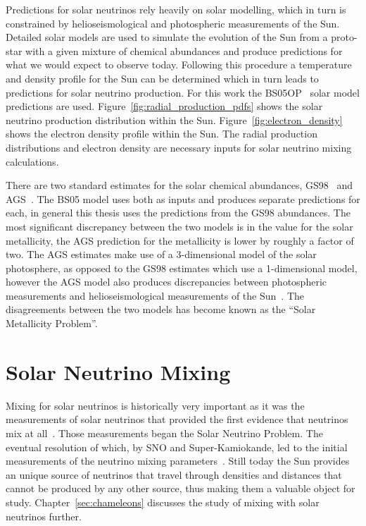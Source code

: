 Predictions for solar neutrinos rely heavily on solar modelling, which in turn
is constrained by helioseismological and photospheric measurements of the Sun.
Detailed solar models are used to simulate the evolution of the Sun from a proto-star
with a given mixture of chemical abundances and produce predictions for
what we would expect to observe today.
Following this procedure a temperature and density profile for the Sun can be determined
which in turn leads to predictions for solar neutrino production.
For this work the BS05OP~\citep{bs_ssm} solar model predictions are used.
Figure~\ref{fig:radial_production_pdfs} shows the solar neutrino production
distribution within the Sun.
Figure~\ref{fig:electron_density} shows the electron density profile within
the Sun.
The radial production distributions and electron density are necessary inputs
for solar neutrino mixing calculations.

There are two standard estimates for the solar chemical abundances,
GS98~\citep{gs98} and AGS~\citep{ags}.
The BS05 model uses both as inputs and produces separate predictions for each,
in general this thesis uses the predictions from the GS98 abundances.
The most significant discrepancy between the two models is in the value
for the solar metallicity, the AGS prediction for the metallicity is
lower by roughly a factor of two.
The AGS estimates make use of a 3-dimensional model of the solar photosphere,
as opposed to the GS98 estimates which use a 1-dimensional model, however
the AGS model also produces discrepancies between photospheric measurements
and helioseismological measurements of the Sun~\citep{ags, bahcall_ssm}.
The disagreements between the two models has become known as the
``Solar Metallicity Problem''.


\section{Solar Neutrino Mixing}
\label{sec:solar_nu_mixing}
Mixing for solar neutrinos is historically very important as it was
the measurements of solar neutrinos that provided the first evidence that
neutrinos mix at all~\citep{homestake,solar_nu_problem}.
Those measurements began the Solar Neutrino Problem.
The eventual resolution of which, by SNO and Super-Kamiokande,
led to the initial measurements of the neutrino mixing parameters~\citep{superk_atmospherics,
sno_second}.
Still today the Sun provides an unique source of neutrinos that travel through
densities and distances that cannot be produced by any other source, thus making
them a valuable object for study.
Chapter~\ref{sec:chameleons} discusses the study of mixing with
solar neutrinos further.

